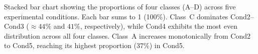 \caption{Stacked bar chart showing the proportions of four classes (A--D) across five experimental conditions. Each bar sums to 1 (100\%). Class~C dominates Cond2--Cond3 (${\approx}44\%$ and $41\%$, respectively), while Cond4 exhibits the most even distribution across all four classes. Class~A increases monotonically from Cond2 to Cond5, reaching its highest proportion ($37\%$) in Cond5.}
